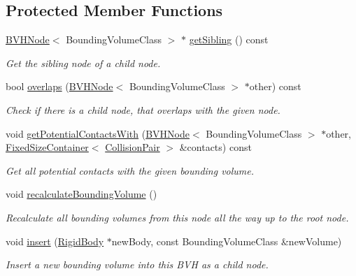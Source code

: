\subsection*{Protected Member Functions}
\begin{DoxyCompactItemize}
\item 
\mbox{\hyperlink{classr3_1_1_b_v_h_node}{B\+V\+H\+Node}}$<$ Bounding\+Volume\+Class $>$ $\ast$ \mbox{\hyperlink{classr3_1_1_b_v_h_node_ae2844615a68ba58f1379dd864f335633}{get\+Sibling}} () const
\begin{DoxyCompactList}\small\item\em Get the sibling node of a child node. \end{DoxyCompactList}\item 
bool \mbox{\hyperlink{classr3_1_1_b_v_h_node_a69ec6f958bbe07629cd979599532dfd8}{overlaps}} (\mbox{\hyperlink{classr3_1_1_b_v_h_node}{B\+V\+H\+Node}}$<$ Bounding\+Volume\+Class $>$ $\ast$other) const
\begin{DoxyCompactList}\small\item\em Check if there is a child node, that overlaps with the given node. \end{DoxyCompactList}\item 
void \mbox{\hyperlink{classr3_1_1_b_v_h_node_a00031bc5ca7a6971a396cad6ff3fe490}{get\+Potential\+Contacts\+With}} (\mbox{\hyperlink{classr3_1_1_b_v_h_node}{B\+V\+H\+Node}}$<$ Bounding\+Volume\+Class $>$ $\ast$other, \mbox{\hyperlink{classr3_1_1_fixed_size_container}{Fixed\+Size\+Container}}$<$ \mbox{\hyperlink{classr3_1_1_collision_pair}{Collision\+Pair}} $>$ \&contacts) const
\begin{DoxyCompactList}\small\item\em Get all potential contacts with the given bounding volume. \end{DoxyCompactList}\item 
void \mbox{\hyperlink{classr3_1_1_b_v_h_node_a52539a0d78d758021a2fe4bedd30e671}{recalculate\+Bounding\+Volume}} ()
\begin{DoxyCompactList}\small\item\em Recalculate all bounding volumes from this node all the way up to the root node. \end{DoxyCompactList}\item 
void \mbox{\hyperlink{classr3_1_1_b_v_h_node_ab6f91727e36689a7edc9f8c168ab904b}{insert}} (\mbox{\hyperlink{classr3_1_1_rigid_body}{Rigid\+Body}} $\ast$new\+Body, const Bounding\+Volume\+Class \&new\+Volume)
\begin{DoxyCompactList}\small\item\em Insert a new bounding volume into this B\+VH as a child node. \end{DoxyCompactList}\end{DoxyCompactItemize}
